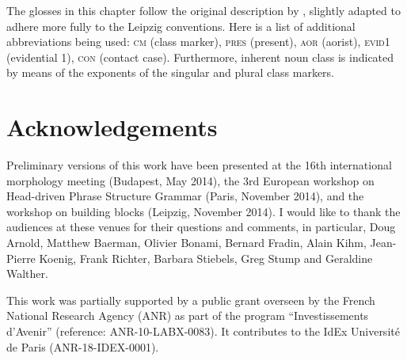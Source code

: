 \documentclass[output=paper]{langsci/langscibook}
\begin{document}
The glosses in this chapter follow the original description by
\citet{Harris09}, slight\-ly adapted to adhere more fully to the Leipzig
conventions. Here is a list of additional abbreviations being used:
\textsc{cm} (class marker), \textsc{pres} (present), \textsc{aor}
(aorist), \textsc{evid1} (evidential 1), \textsc{con} (contact
case). Furthermore, inherent noun class is indicated by means of the
exponents of the singular and plural class markers.\largerpage

\section*{Acknowledgements}
Preliminary versions of this work have been presented at the 16th
international morphology meeting (Budapest, May 2014), the 3rd
European workshop on Head-driven Phrase Structure Grammar (Paris,
November 2014), and the workshop on building blocks (Leipzig,
November 2014). I would like to thank the audiences at these venues
for their questions and comments, in particular, Doug Ar\-nold,
Matthew Baerman, Olivier Bonami, Bernard Fradin, Alain Kihm,
Jean-Pierre Koenig, Frank Richter, Barbara Stiebels, Greg Stump and
Geraldine Wal\-ther.

This work was partially supported by a public grant overseen by the
French National Research Agency (ANR) as part of the program
``Investissements d’Avenir'' (reference: ANR-10-LABX-0083). It
contributes to the IdEx Université de Paris (ANR-18-IDEX-0001).

{\sloppy\printbibliography[heading=subbibliography,notkeyword=this]}
\end{document}
